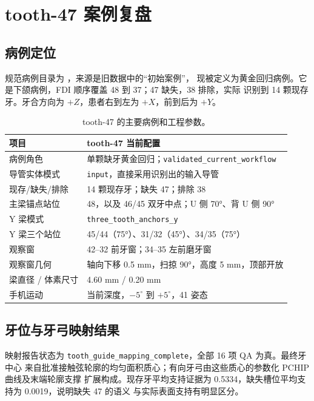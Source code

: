 \chapter{tooth-47 案例复盘}

\section{病例定位}

规范病例目录为 ，来源是旧数据中的“初始案例”，
现被定义为黄金回归病例。它是下颌病例，FDI 顺序覆盖 48 到 37；47 缺失，38 排除，实际
识别到 14 颗现存牙。牙合方向为 $+Z$，患者右到左为 $+X$，前到后为 $+Y$。

\begin{table}[H]
\centering
\begin{tabularx}{\textwidth}{p{}X}
  \toprule
  项目 & tooth-47 当前配置\\
  \midrule
  病例角色 & 单颗缺牙黄金回归；\texttt{validated\_current\_workflow}\\
  导管实体模式 & \texttt{input}，直接采用识别出的输入导管\\
  现存/缺失/排除 & 14 颗现存牙；缺失 47；排除 38\\
  主梁锚点站位 & 48，以及 46/45 双牙中点；U 侧 70°、背 U 侧 90°\\
  Y 梁模式 & \texttt{three\_tooth\_anchors\_y}\\
  Y 梁三个站位 & 45/44（75°）、31/32（45°）、34/35（75°）\\
  观察窗 & 42--32 前牙窗；34--35 左前磨牙窗\\
  观察窗几何 & 轴向下移 0.5 mm，扫掠 90°，高度 5 mm，顶部开放\\
  梁直径 / 体素尺寸 & 4.60 mm / 0.20 mm\\
  手机运动 & 当前深度，$-5^\circ$ 到 $+5^\circ$，41 姿态\\
  \bottomrule
\end{tabularx}
\caption{tooth-47 的主要病例和工程参数。}
\end{table}

\section{牙位与牙弓映射结果}

映射报告状态为 \texttt{tooth\_guide\_mapping\_complete}，全部 16 项 QA 为真。最终牙中心
来自批准接触弦轮廓的均匀面积质心；有向牙弓由这些质心的参数化 PCHIP 曲线及末端轮廓支撑
扩展构成。现存牙平均支持证据为 0.5334，缺失槽位平均支持为 0.0019，说明缺失 47 的语义
与实际表面支持有明显区分。

